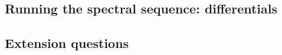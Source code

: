 \subsection{Running the spectral sequence: differentials}






\subsection{Extension questions}







\begin{rem}[Variants]
\end{rem}
